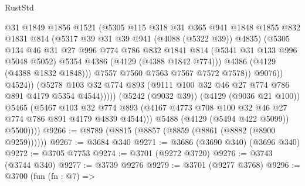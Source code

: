 \begin{lexlean}{RustStd}
\begin{coremodule}
{\begin{coremodule}
{{{{{{{{{{{{{{                                @31
                                @1849
                                @1856
                                @1521
                                (@5305
                                  @115
                                  @318
                                  @31
                                  @365
                                  @941
                                  @1848
                                  @1855
                                  @832
                                  @1831
                                  @814
                                  (@5317 @39 @31 @39 @941 (@4088 (@5322 @39)) @4835)
                                  (@5305
                                    @134
                                    @46
                                    @31
                                    @27
                                    @996
                                    @774
                                    @786
                                    @832
                                    @1841
                                    @814
                                    (@5341 @31 @133 @996 @5048 @5052)
                                    @5354
                                    @4386
                                    (@4129 (@4388 @1842 @774)))
                                  @4386
                                  (@4129 (@4388 @1832 @1848)))
                                @7557
                                @7560
                                @7563
                                @7567
                                @7572
                                @7578))
                            @9076))
                        @4524))
                    (@5278
                      @103
                      @32
                      @774
                      @893
                      (@9111 @100 @32 @46 @27 @774 @786 @891 @4179 @5354 @4544)))))
              (@5242 (@9032 @39))
              (@4129 (@9036 @21 @100))
              @5465
              (@5467
                @103
                @32
                @774
                @893
                (@4167 @4773 @708 @100 @32 @46 @27 @774 @786 @891 @4179 @4839 @4544)))
            @5488
            (@4129 (@5494 @422 @5099))
            @5500))))
@9266 := @8789 (@8815 (@8857 (@8859 (@8861 (@8882 (@8900 @9259))))))
@9267 := @3684 @340
@9271 := @3686 (@3690 @340) (@3696 @340)
@9272 := @3705 @7753
@9274 := @3701 (@9272 @3720)
@9276 := @3743 (@3744 @340)
@9277 := @3739 @9276
@9279 := @3701 (@9277 @3768)
@9296 := @3700
    (fun (fn : @7) =>
}}}}}}}}}}}}}}
\end{coremodule}}
\end{coremodule}
\end{lexlean}
